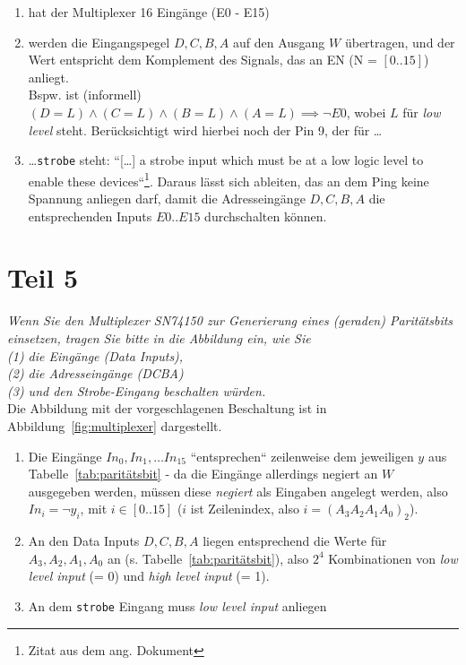 \begin{enumerate}
    \itemsep0.5em
    \item hat der Multiplexer 16 Eingänge (E0 - E15)
    \item werden die Eingangspegel $D, C, B, A$ auf den Ausgang $W$ übertragen, und der Wert entspricht dem Komplement des Signals, das an EN (N = $[0..15]$) anliegt. \\
    Bspw. ist (informell) $(D = L) \land  (C = L) \land (B = L) \land (A = L) \implies \neg E0$, wobei $L$ für \textit{low level} steht.
    Berücksichtigt wird hierbei noch der Pin 9, der für \ldots
    \item \ldots \texttt{strobe} steht: ``[\ldots] a strobe input which must be at a low logic level to enable these devices``\footnote{
    Zitat aus dem ang. Dokument
    }.
    Daraus lässt sich ableiten, das an dem Ping keine Spannung anliegen darf, damit die Adresseingänge $D, C, B, A$ die entsprechenden Inputs $E0..E15$ durchschalten können.
\end{enumerate}

\section{Teil 5}

\textit{Wenn Sie den Multiplexer SN74150 zur Generierung eines (geraden)
Paritätsbits einsetzen, tragen Sie bitte in die Abbildung ein, wie Sie\\
(1) die Eingänge (Data Inputs),\\
(2) die Adresseingänge (DCBA)\\
(3) und den Strobe-Eingang beschalten würden.}\\

\noindent
Die Abbildung mit der vorgeschlagenen Beschaltung ist in Abbildung~\ref{fig:multiplexer} dargestellt.

\begin{enumerate}
    \itemsep0.5em
    \item Die Eingänge $In_0, In_1, \ldots In_{15}$ ``entsprechen`` zeilenweise dem jeweiligen $y$ aus Tabelle~\ref{tab:paritätsbit} -
    da die Eingänge allerdings negiert an $W$ ausgegeben werden, müssen diese \textit{negiert} als Eingaben angelegt werden, also
     $In_i = \neg y_i$, mit $i \in [0..15]$ ($i$ ist Zeilenindex, also $i = (A_3 A_2 A_1 A_0)_2$).
    \item An den Data Inputs $D, C, B, A$  liegen entsprechend die Werte für $A_3, A_2, A_1, A_0$ an (s. Tabelle~\ref{tab:paritätsbit}), also $2^4$ Kombinationen von \textit{low level input} (= 0) und \textit{high level input} (= 1).
    \item An dem \texttt{strobe} Eingang muss \textit{low level input} anliegen
\end{enumerate}

